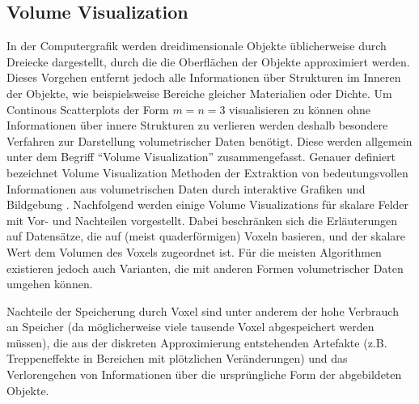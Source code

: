\documentclass[a4paper,fontsize=12pt,toc=bib,halfparskip,ngerman]{scrartcl}
\begin{document}
\subsection{Volume Visualization}
In der Computergrafik werden dreidimensionale Objekte \"ublicherweise durch Dreiecke dargestellt, durch die die Oberfl\"achen der Objekte approximiert werden. Dieses Vorgehen entfernt jedoch alle Informationen \"uber Strukturen im Inneren der Objekte, wie beispielsweise Bereiche gleicher Materialien oder Dichte. Um Continous Scatterplots der Form $m=n=3$ visualisieren zu k\"onnen ohne Informationen \"uber innere Strukturen zu verlieren werden deshalb besondere Verfahren zur Darstellung volumetrischer Daten ben\"otigt. Diese werden allgemein unter dem Begriff ``Volume Visualization'' zusammengefasst. Genauer definiert bezeichnet Volume Visualization Methoden der Extraktion von bedeutungsvollen Informationen aus volumetrischen Daten durch interaktive Grafiken und Bildgebung \cite[S.~127]{hansen2005visualization}. Nachfolgend werden einige Volume Visualizations f\"ur skalare Felder  mit Vor- und Nachteilen vorgestellt. Dabei beschr\"anken sich die Erl\"auterungen auf Datens\"atze, die auf (meist quaderf\"ormigen) Voxeln basieren, und der skalare Wert dem Volumen des Voxels zugeordnet ist. F\"ur die meisten Algorithmen existieren jedoch auch Varianten, die mit anderen Formen volumetrischer Daten umgehen k\"onnen.

Nachteile der Speicherung durch Voxel sind unter anderem der hohe Verbrauch an Speicher (da m\"oglicherweise viele tausende Voxel abgespeichert werden m\"ussen), die aus der diskreten Approximierung entstehenden Artefakte (z.B. Treppeneffekte in Bereichen mit pl\"otzlichen Ver\"anderungen) und das Verlorengehen von Informationen \"uber die urspr\"ungliche Form der abgebildeten Objekte.
\end{document}
